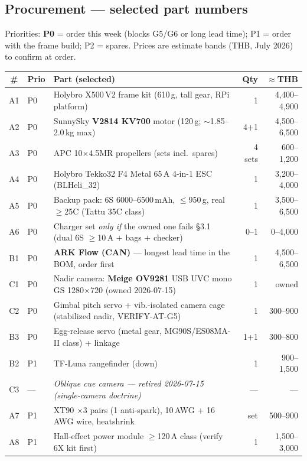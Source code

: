 \documentclass[11pt,a4paper]{article}
\newcommand{\warn}[1]{\textcolor{red!70!black}{\textbf{#1}}}
\begin{document}
\subsection{Procurement --- selected part numbers}
Priorities: \textbf{P0} = order this week (blocks G5/G6 or long lead time);
P1 = order with the frame build; P2 = spares. Prices are estimate bands
(THB, July 2026) to confirm at order.

\begin{table}[H]\centering\small
\begin{tabularx}{\textwidth}{@{}clXrr@{}}
\toprule
\# & Prio & \textbf{Part (selected)} & \textbf{Qty} & \textbf{$\approx$THB} \\
\midrule
A1 & P0 & Holybro X500\,V2 frame kit (610\,g, tall gear, RPi platform) & 1 & 4{,}400--4{,}900 \\
A2 & P0 & SunnySky \textbf{V2814 KV700} motor (120\,g; $\sim$1.85--2.0\,kg max) & 4+1 & 4{,}500--6{,}500 \\
A3 & P0 & APC 10$\times$4.5MR propellers (sets incl.\ spares) & 4 sets & 600--1{,}200 \\
A4 & P0 & Holybro Tekko32 F4 Metal 65\,A 4-in-1 ESC (BLHeli\_32) & 1 & 3{,}200--4{,}000 \\
A5 & P0 & Backup pack: 6S 6000--6500\,mAh, $\le$950\,g, real $\ge$25C (Tattu 35C class) & 1 & 3{,}500--6{,}500 \\
A6 & P0 & Charger set \emph{only if} the owned one fails \S3.1 (dual 6S $\ge$10\,A + bags + checker) & 0--1 & 0--4{,}000 \\
B1 & P0 & \warn{ARK Flow (CAN)} --- longest lead time in the BOM, order first & 1 & 4{,}500--6{,}500 \\
C1 & P0 & Nadir camera: \textbf{Meige OV9281} USB UVC mono GS 1280$\times$720 (owned 2026-07-15) & 1 & owned \\
C2 & P0 & Gimbal pitch servo + vib.-isolated camera cage (stabilized nadir, VERIFY-AT-G5) & 1 & 300--900 \\
B3 & P0 & Egg-release servo (metal gear, MG90S/ES08MA-II class) + linkage & 1+1 & 300--800 \\
\midrule
B2 & P1 & TF-Luna rangefinder (down) & 1 & 900--1{,}500 \\
C3 & --- & \emph{Oblique cue camera — retired 2026-07-15 (single-camera doctrine)} & --- & --- \\
A7 & P1 & XT90 $\times$3 pairs (1 anti-spark), 10\,AWG + 16\,AWG wire, heatshrink & set & 500--900 \\
A8 & P1 & Hall-effect power module $\ge$120\,A class (verify 6X kit first) & 1 & 1{,}500--3{,}000 \\

\end{tabularx}
\end{table}
\end{document}
